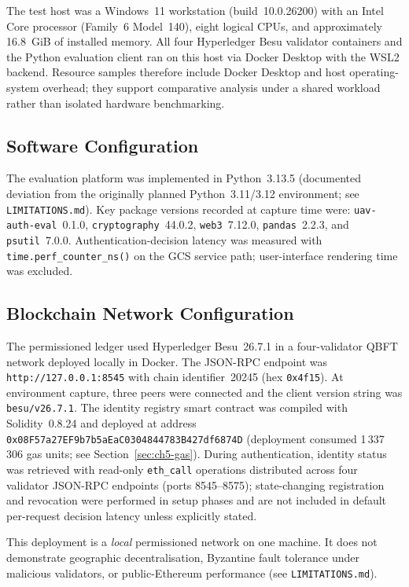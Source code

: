 The test host was a Windows~11 workstation (build~10.0.26200) with an Intel Core processor (Family~6 Model~140), eight logical CPUs, and approximately 16.8~GiB of installed memory. All four Hyperledger Besu validator containers and the Python evaluation client ran on this host via Docker Desktop with the WSL2 backend. Resource samples therefore include Docker Desktop and host operating-system overhead; they support comparative analysis under a shared workload rather than isolated hardware benchmarking.

\subsection{Software Configuration}
\label{sec:ch5-software}

The evaluation platform was implemented in Python~3.13.5 (documented deviation from the originally planned Python~3.11/3.12 environment; see \texttt{LIMITATIONS.md}). Key package versions recorded at capture time were: \texttt{uav-auth-eval}~0.1.0, \texttt{cryptography}~44.0.2, \texttt{web3}~7.12.0, \texttt{pandas}~2.2.3, and \texttt{psutil}~7.0.0. Authentication-decision latency was measured with \texttt{time.perf\_counter\_ns()} on the GCS service path; user-interface rendering time was excluded.

\subsection{Blockchain Network Configuration}
\label{sec:ch5-blockchain-config}

The permissioned ledger used Hyperledger Besu~26.7.1 in a four-validator QBFT network deployed locally in Docker. The JSON-RPC endpoint was \texttt{http://127.0.0.1:8545} with chain identifier~20245 (hex \texttt{0x4f15}). At environment capture, three peers were connected and the client version string was \texttt{besu/v26.7.1}. The identity registry smart contract was compiled with Solidity~0.8.24 and deployed at address \texttt{0x08F57a27EF9b7b5aEaC0304844783B427df6874D} (deployment consumed 1\,337\,306 gas units; see Section~\ref{sec:ch5-gas}). During authentication, identity status was retrieved with read-only \texttt{eth\_call} operations distributed across four validator JSON-RPC endpoints (ports 8545--8575); state-changing registration and revocation were performed in setup phases and are not included in default per-request decision latency unless explicitly stated.

This deployment is a \emph{local} permissioned network on one machine. It does not demonstrate geographic decentralisation, Byzantine fault tolerance under malicious validators, or public-Ethereum performance (see \texttt{LIMITATIONS.md}).

